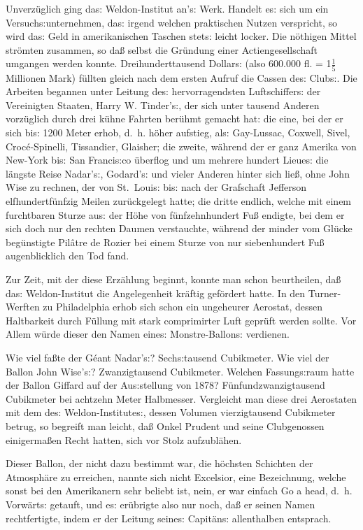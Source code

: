 \documentclass[oneside,12pt]{book}
\newenvironment{antiqua}{\normalfont}{}
\newcommand{\s}{s:}
\begin{document}
Unverz\"uglich ging da{\s} Weldon-Institut an'{\s} Werk. Handelt
e{\s} sich um ein Versuch{\s}unternehmen, da{\s} irgend welchen
praktischen Nutzen verspricht, so wird da{\s} Geld in amerikanischen
Taschen stet{\s} leicht locker. Die n\"othigen Mittel str\"omten
zusammen, so da{\ss} selbst die Gr\"undung einer Actiengesellschaft
umgangen werden konnte. Dreihunderttausend Dollar{\s} (also 600.000
fl. = 1$\frac{1}{5}$ Millionen Mark) f\"ullten gleich nach dem ersten Aufruf
die Cassen de{\s} Club{\s}. Die Arbeiten begannen unter Leitung
de{\s} hervorragendsten Luftschiffer{\s} der Vereinigten Staaten,
Harry W. Tinder'{\s}, der sich unter tausend Anderen vorz\"uglich
durch drei k\"uhne Fahrten ber\"uhmt gemacht hat: die eine, bei der
er sich bi{\s} 1200 Meter erhob, d.~h. h\"oher aufstieg, al{\s}
Gay-Lussac, Coxwell, Sivel, Croc\'e-Spinelli, Tissandier, Glaisher;
die zweite, w\"ahrend der er ganz Amerika von New-York bi{\s} San
Franci{\s}co \"uberflog und um mehrere hundert Lieue{\s} die
l\"angste Reise Nadar'{\s}, Godard'{\s} und vieler Anderen hinter
sich lie{\ss}, ohne John Wise zu rechnen, der von St.~Loui{\s} bi{\s}
nach der Grafschaft Jefferson elfhundertf\"unfzig Meilen zur\"uckgelegt
hatte; die dritte endlich, welche mit einem furchtbaren Sturze au{\s}
der H\"ohe von f\"unfzehnhundert Fu{\ss} endigte, bei dem er sich
doch nur den rechten Daumen verstauchte, w\"ahrend der minder vom
Gl\"ucke beg\"unstigte Pil\^atre de Rozier bei einem Sturze von nur
siebenhundert Fu{\ss} augenblicklich den Tod fand.

Zur Zeit, mit der diese Erz\"ahlung beginnt, konnte man schon
beurtheilen, da{\ss} da{\s} Weldon-Institut die Angelegenheit
kr\"aftig gef\"ordert hatte. In den Turner-Werften zu Philadelphia
erhob sich schon ein ungeheurer Aerostat, dessen Haltbarkeit durch
F\"ullung mit stark comprimirter Luft gepr\"uft werden sollte. Vor
Allem w\"urde dieser den Namen eine{\s} Monstre-Ballon{\s} verdienen.

Wie viel fa{\ss}te der G\'eant Nadar'{\s}? Sech{\s}tausend
Cubikmeter. Wie viel der Ballon John Wise'{\s}? Zwanzigtausend
Cubikmeter. Welchen Fassung{\s}raum hatte der Ballon Giffard auf der
Au{\s}stellung von 1878? F\"unfundzwanzigtausend Cubikmeter bei
acht\/zehn Meter Halbmesser. Vergleicht man diese drei Aerostaten mit
dem de{\s} Weldon-Institute{\s}, dessen Volumen vierzigtausend
Cubikmeter betrug, so begreift man leicht, da{\ss} Onkel Prudent und
seine Clubgenossen einigerma{\ss}en Recht hatten, sich vor Stolz
aufzubl\"ahen.

Dieser Ballon, der nicht dazu bestimmt war, die h\"ochsten Schichten
der Atmosph\"are zu erreichen, nannte sich nicht
{\glqq}Excelsior{\grqq}, eine Bezeichnung, welche sonst bei den
Amerikanern sehr beliebt ist, nein, er war einfach \begin{antiqua}Go
a head\end{antiqua}, d.~h. {\glqq}Vorw\"art{\s}{\grqq} getauft, und
e{\s} er\"ubrigte also nur noch, da{\ss} er seinen Namen
rechtfertigte, indem er der Leitung seine{\s} Capit\"an{\s}
allenthalben entsprach.
\end{document}
